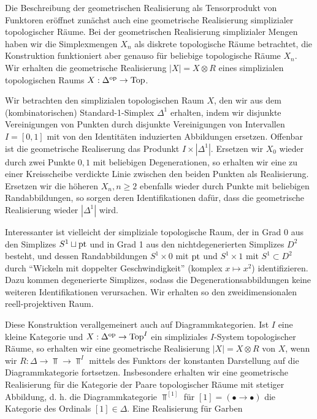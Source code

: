 Die Beschreibung der geometrischen Realisierung als Tensorprodukt von
Funktoren eröffnet zunächst auch eine geometrische Realisierung
simplizialer topologischer Räume. Bei der geometrischen Realisierung
simplizialer Mengen haben wir die Simplexmengen $X_n$ als diskrete
topologische Räume betrachtet, die Konstruktion funktioniert aber
genauso für beliebige topologische Räume $X_n$. Wir erhalten die
geometrische Realisierung $|X| = X \otimes R$ eines simplizialen
topologischen Raums $X: \Delta^\mathrm{op} \to \operatorname{Top}$.
\begin{bsp}
  Wir betrachten den simplizialen topologischen Raum $X$, den wir aus
  dem (kombinatorischen) Standard-1-Simplex $\Delta^1$ erhalten, indem
  wir disjunkte Vereinigungen von Punkten durch disjunkte
  Vereinigungen von Intervallen $I = [0, 1]$ mit von den Identitäten
  induzierten Abbildungen ersetzen. Offenbar ist die geometrische
  Realiserung das Produnkt $I \times |\Delta^1|$. Ersetzen wir $X_0$
  wieder durch zwei Punkte ${0, 1}$ mit beliebigen Degenerationen, so
  erhalten wir eine zu einer Kreisscheibe verdickte Linie zwischen den
  beiden Punkten als Realisierung. Ersetzen wir die höheren $X_n, n
  \geq 2$ ebenfalls wieder durch Punkte mit beliebigen
  Randabbildungen, so sorgen deren Identifikationen dafür, dass die
  geometrische Realisierung wieder $|\Delta^1|$ wird.

  Interessanter ist vielleicht der simpliziale topologische Raum, der
  in Grad 0 aus den Simplizes $S^1 \sqcup \operatorname{pt}$ und in Grad 1 aus
  den nichtdegenerierten Simplizes $D^2$ besteht, und dessen
  Randabbildungen $S^1 \times {0}$ mit $\operatorname{pt}$ und $S^1 \times {1}$
  mit $S^1 \subset D^2$ durch ``Wickeln mit doppelter
  Geschwindigkeit'' (komplex $x \mapsto x^2$) identifizieren. Dazu
  kommen degenerierte Simplizes, sodass die Degenerationsabbildungen
  keine weiteren Identifikationen verursachen. Wir erhalten so den
  zweidimensionalen reell-projektiven Raum.
\end{bsp}
Diese Konstruktion verallgemeinert auch auf Diagrammkategorien. Ist
$I$ eine kleine Kategorie und $X: \Delta^\mathrm{op} \to \operatorname{Top}^I$ ein
simpliziales $I$-System topologischer Räume, so erhalten wir eine
geometrische Realisierung $|X| = X \otimes R$ von $X$, wenn wir $R:
\Delta \to \Top \to \Top^I$ mittels des Funktors der konstanten
Darstellung auf die Diagrammkategorie fortsetzen. Insbesondere
erhalten wir eine geometrische Realisierung für die Kategorie der
Paare topologischer Räume mit stetiger Abbildung, d. h. die
Diagrammkategorie $\Top^{[1]}$ für $[1] = (\bullet \to \bullet)$ die
Kategorie des Ordinals $[1] \in \Delta$. Eine Realisierung für Garben
